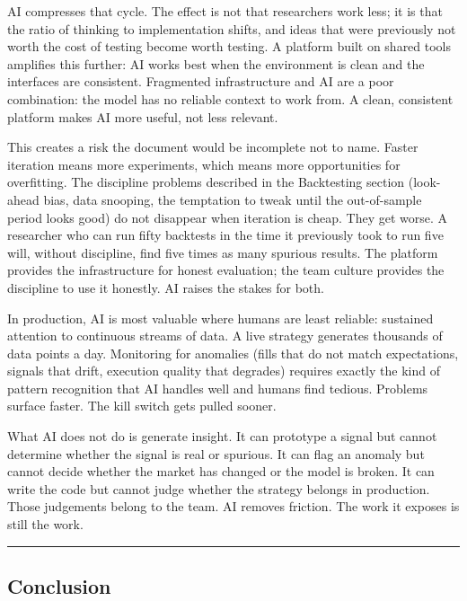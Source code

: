 \documentclass[
  11pt,
]{article}
\begin{document}
AI compresses that cycle. The effect is not that researchers work less;
it is that the ratio of thinking to implementation shifts, and ideas
that were previously not worth the cost of testing become worth testing.
A platform built on shared tools amplifies this further: AI works best
when the environment is clean and the interfaces are consistent.
Fragmented infrastructure and AI are a poor combination: the model
has no reliable context to work from. A clean, consistent platform makes
AI more useful, not less relevant.

This creates a risk the document would be incomplete not to name. Faster
iteration means more experiments, which means more opportunities for
overfitting. The discipline problems described in the Backtesting
section (look-ahead bias, data snooping, the temptation to tweak
until the out-of-sample period looks good) do not disappear when
iteration is cheap. They get worse. A researcher who can run fifty
backtests in the time it previously took to run five will, without
discipline, find five times as many spurious results. The platform
provides the infrastructure for honest evaluation; the team culture
provides the discipline to use it honestly. AI raises the stakes for
both.

In production, AI is most valuable where humans are least reliable:
sustained attention to continuous streams of data. A live strategy
generates thousands of data points a day. Monitoring for anomalies (fills that do not match expectations, signals that drift, execution
quality that degrades) requires exactly the kind of pattern
recognition that AI handles well and humans find tedious. Problems
surface faster. The kill switch gets pulled sooner.

What AI does not do is generate insight. It can prototype a signal but
cannot determine whether the signal is real or spurious. It can flag an
anomaly but cannot decide whether the market has changed or the model is
broken. It can write the code but cannot judge whether the strategy
belongs in production. Those judgements belong to the team. AI removes
friction. The work it exposes is still the work.

\begin{center}\rule{0.5\linewidth}{0.5pt}\end{center}

\subsection{Conclusion}\label{conclusion}
\end{document}
